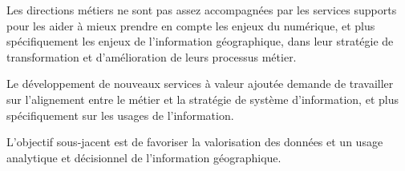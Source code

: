 \stopitemize

Les directions métiers ne sont pas assez accompagnées par les services supports
pour les aider à mieux prendre en
compte les enjeux du numérique, et plus spécifiquement les enjeux de
l'information géographique, dans leur stratégie de transformation et
d'amélioration de leurs processus métier.

Le développement de nouveaux services à valeur ajoutée demande de travailler
sur l'alignement entre le métier et la stratégie de système d'information, et
plus spécifiquement sur les usages de l'information.

L'objectif sous-jacent est de favoriser la valorisation des données et un
usage analytique et décisionnel de l'information géographique.